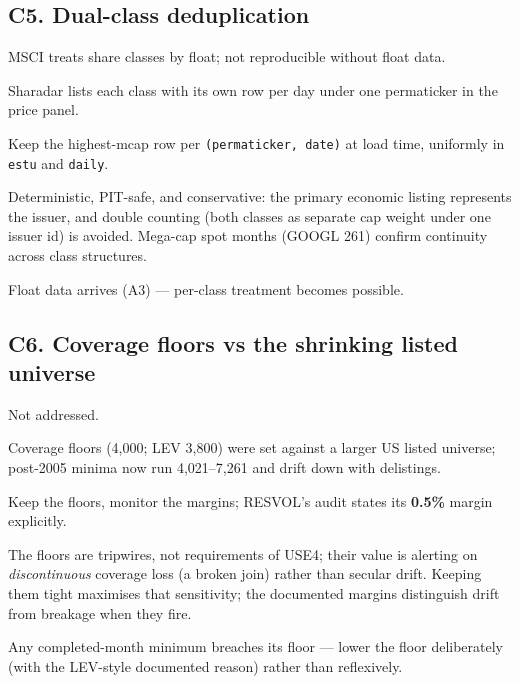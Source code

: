 \documentclass[11pt,a4paper]{article}
\begin{document}
\subsection{C5. Dual-class deduplication}

\begin{description}[style=nextline]
  \item[USE4] MSCI treats share classes by float; not reproducible without
    float data.
  \item[Deviation] Sharadar lists each class with its own row per day under
    one permaticker in the price panel.
  \item[Solution] Keep the highest-mcap row per \texttt{(permaticker, date)}
    at load time, uniformly in \texttt{estu} and \texttt{daily}.
  \item[Validity] Deterministic, PIT-safe, and conservative: the primary
    economic listing represents the issuer, and double counting (both classes
    as separate cap weight under one issuer id) is avoided. Mega-cap spot
    months (GOOGL 261) confirm continuity across class structures.
  \item[Revisit when] Float data arrives (A3) --- per-class treatment becomes
    possible.
\end{description}

\subsection{C6. Coverage floors vs the shrinking listed universe}

\begin{description}[style=nextline]
  \item[USE4] Not addressed.
  \item[Deviation] Coverage floors (4{,}000; LEV 3{,}800) were set against a
    larger US listed universe; post-2005 minima now run 4{,}021--7{,}261 and
    drift down with delistings.
  \item[Solution] Keep the floors, monitor the margins; RESVOL's audit states
    its \textbf{0.5\%} margin explicitly.
  \item[Validity] The floors are tripwires, not requirements of USE4; their
    value is alerting on \emph{discontinuous} coverage loss (a broken join)
    rather than secular drift. Keeping them tight maximises that sensitivity;
    the documented margins distinguish drift from breakage when they fire.
  \item[Revisit when] Any completed-month minimum breaches its floor ---
    lower the floor deliberately (with the LEV-style documented reason) rather
    than reflexively.
\end{description}
\end{document}
